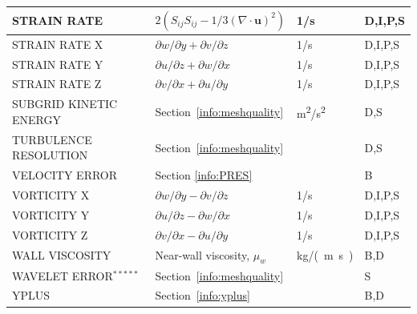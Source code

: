 \documentclass[11pt]{book}
\begin{document}
\begin{longtable}{@{\extracolsep{\fill}}|l|l|l|l|}
{\ct STRAIN RATE}                               & $2(S_{ij}S_{ij}-1/3(\nabla\cdot\mathbf{u})^2)$    & 1/s            & D,I,P,S      \\ \hline
{\ct STRAIN RATE X}                             & $\partial w/\partial y + \partial v/\partial z$   & 1/s            & D,I,P,S      \\ \hline
{\ct STRAIN RATE Y}                             & $\partial u/\partial z + \partial w/\partial x$   & 1/s            & D,I,P,S      \\ \hline
{\ct STRAIN RATE Z}                             & $\partial v/\partial x + \partial u/\partial y$   & 1/s            & D,I,P,S      \\ \hline
{\ct SUBGRID KINETIC ENERGY}                    & Section~\ref{info:meshquality}                    & \si{m^2/s^2}   & D,S          \\ \hline
{\ct TURBULENCE RESOLUTION}                     & Section~\ref{info:meshquality}                    &                & D,S          \\ \hline
{\ct VELOCITY ERROR}                            & Section \ref{info:PRES}                           &                & B            \\ \hline
{\ct VORTICITY X}                               & $\partial w/\partial y - \partial v/\partial z$   & 1/s            & D,I,P,S      \\ \hline
{\ct VORTICITY Y}                               & $\partial u/\partial z - \partial w/\partial x$   & 1/s            & D,I,P,S      \\ \hline
{\ct VORTICITY Z}                               & $\partial v/\partial x - \partial u/\partial y$   & 1/s            & D,I,P,S      \\ \hline
{\ct WALL VISCOSITY}                            & Near-wall viscosity, $\mu_w$                      & \si{kg/(m.s)}  & B,D          \\ \hline
{\ct WAVELET ERROR}$^{*****}$                   & Section~\ref{info:meshquality}                    &                & S            \\ \hline
{\ct YPLUS}                                     & Section~\ref{info:yplus}                          &                & B,D          \\ \hline
\end{longtable}
\end{document}
